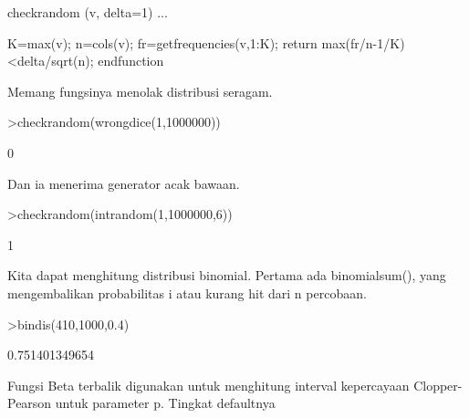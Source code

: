 \documentclass[a4paper,10pt]{article}
\begin{document}
\begin{eulernotebook}
\begin{eulercomment}
\begin{eulercomment}
\begin{eulercomment}
\begin{eulercomment}
\begin{eulercomment}
\begin{eulercomment}
\begin{eulercomment}
\begin{eulercomment}
\begin{eulercomment}
\begin{eulercomment}
\begin{eulercomment}
\begin{eulercomment}
\begin{eulercomment}
\begin{eulercomment}
\begin{eulercomment}
\begin{eulercomment}
\begin{eulercomment}
\begin{eulercomment}
\begin{eulercomment}
\begin{eulercomment}
\begin{eulercomment}
\begin{eulercomment}
\begin{eulercomment}
\begin{eulercomment}
\begin{eulercomment}
\begin{eulercomment}
\begin{eulercomment}
\begin{eulercomment}
\begin{eulercomment}
\begin{eulercomment}
\begin{eulercomment}
\begin{eulercomment}
\begin{eulercomment}
\begin{eulercomment}
\begin{eulercomment}
\begin{eulercomment}
\begin{eulercomment}
\begin{eulercomment}
\begin{eulercomment}
\begin{eulercomment}
\begin{eulercomment}
\begin{eulercomment}
\begin{eulercomment}
\begin{eulercomment}
\begin{eulercomment}
\begin{eulercomment}
\begin{eulercomment}
\begin{eulercomment}
\begin{eulercomment}
\begin{eulercomment}
\begin{eulercomment}
\begin{eulercomment}
\begin{eulercomment}
\begin{eulercomment}
\begin{eulercomment}
\begin{eulercomment}
\begin{eulercomment}
\begin{eulercomment}
\begin{eulercomment}
\begin{eulercomment}
\begin{eulercomment}
\begin{eulercomment}
\begin{eulercomment}
\begin{eulercomment}
\begin{eulercomment}
\begin{eulercomment}
\begin{eulerprompt}
checkrandom (v, delta=1) ...
\end{eulerprompt}
\begin{eulerudf}
    K=max(v); n=cols(v);
    fr=getfrequencies(v,1:K);
    return max(fr/n-1/K)<delta/sqrt(n);
    endfunction
\end{eulerudf}
\begin{eulercomment}
Memang fungsinya menolak distribusi seragam.
\end{eulercomment}
\begin{eulerprompt}
>checkrandom(wrongdice(1,1000000))
\end{eulerprompt}
\begin{euleroutput}
  0
\end{euleroutput}
\begin{eulercomment}
Dan ia menerima generator acak bawaan.
\end{eulercomment}
\begin{eulerprompt}
>checkrandom(intrandom(1,1000000,6))
\end{eulerprompt}
\begin{euleroutput}
  1
\end{euleroutput}
\begin{eulercomment}
Kita dapat menghitung distribusi binomial. Pertama ada binomialsum(),
yang mengembalikan probabilitas i atau kurang hit dari n percobaan.
\end{eulercomment}
\begin{eulerprompt}
>bindis(410,1000,0.4)
\end{eulerprompt}
\begin{euleroutput}
  0.751401349654
\end{euleroutput}
\begin{eulercomment}
Fungsi Beta terbalik digunakan untuk menghitung interval kepercayaan
Clopper-Pearson untuk parameter p. Tingkat defaultnya 
\end{eulercomment}
\end{eulercomment}
\end{eulercomment}
\end{eulercomment}
\end{eulercomment}
\end{eulercomment}
\end{eulercomment}
\end{eulercomment}
\end{eulercomment}
\end{eulercomment}
\end{eulercomment}
\end{eulercomment}
\end{eulercomment}
\end{eulercomment}
\end{eulercomment}
\end{eulercomment}
\end{eulercomment}
\end{eulercomment}
\end{eulercomment}
\end{eulercomment}
\end{eulercomment}
\end{eulercomment}
\end{eulercomment}
\end{eulercomment}
\end{eulercomment}
\end{eulercomment}
\end{eulercomment}
\end{eulercomment}
\end{eulercomment}
\end{eulercomment}
\end{eulercomment}
\end{eulercomment}
\end{eulercomment}
\end{eulercomment}
\end{eulercomment}
\end{eulercomment}
\end{eulercomment}
\end{eulercomment}
\end{eulercomment}
\end{eulercomment}
\end{eulercomment}
\end{eulercomment}
\end{eulercomment}
\end{eulercomment}
\end{eulercomment}
\end{eulercomment}
\end{eulercomment}
\end{eulercomment}
\end{eulercomment}
\end{eulercomment}
\end{eulercomment}
\end{eulercomment}
\end{eulercomment}
\end{eulercomment}
\end{eulercomment}
\end{eulercomment}
\end{eulercomment}
\end{eulercomment}
\end{eulercomment}
\end{eulercomment}
\end{eulercomment}
\end{eulercomment}
\end{eulercomment}
\end{eulercomment}
\end{eulercomment}
\end{eulercomment}
\end{eulercomment}
\end{eulernotebook}
\end{document}
